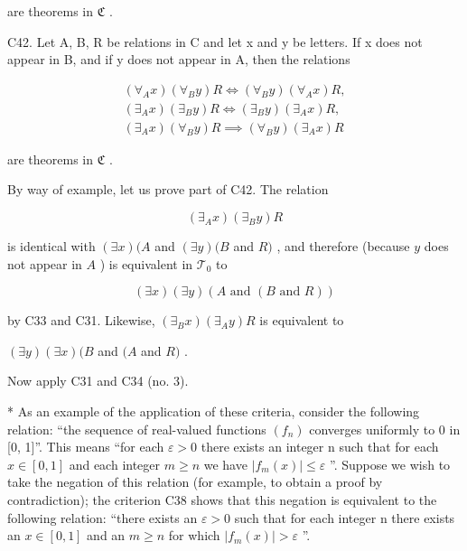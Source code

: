 are theorems in \(\mathfrak{C}\) .

C42. Let A, B, R be relations in C and let x and y be letters. If x does not appear in B, and if y does not appear in A, then the relations

\[
\begin{array}{l} (\forall_ {A} x) (\forall_ {B} y) R \iff (\forall_ {B} y) (\forall_ {A} x) R, \\ (\exists_ {A} x) (\exists_ {B} y) R \iff (\exists_ {B} y) (\exists_ {A} x) R, \\ (\exists_ {A} x) (\forall_ {B} y) R \implies (\forall_ {B} y) (\exists_ {A} x) R \end{array}
\]

are theorems in \(\mathfrak{C}\) .

By way of example, let us prove part of C42. The relation

\[
(\exists_ {A} x) (\exists_ {B} y) R
\]

is identical with \((\exists x)(A\) and \((\exists y)(B\) and \(R)\) , and therefore (because \(y\) does not appear in \(A\) ) is equivalent in \(\mathcal{T}_0\) to

\[
(\exists x) (\exists y) (A \text {   and   } (B \text {   and   } R))
\]

by C33 and C31. Likewise, \((\exists_{B}x)(\exists_{A}y)R\) is equivalent to

\((\exists y)(\exists x)(B\) and \((A\) and \(R)\) .

Now apply C31 and C34 (no. 3).

* As an example of the application of these criteria, consider the following relation: ``the sequence of real-valued functions \((f_{n})\) converges uniformly to 0 in {[}0, 1{]}''. This means ``for each \(\varepsilon > 0\) there exists an integer n such that for each \(x \in [0, 1]\) and each integer \(m \geqslant n\) we have \(|f_{m}(x)| \leqslant \varepsilon\) ''. Suppose we wish to take the negation of this relation (for example, to obtain a proof by contradiction); the criterion C38 shows that this negation is equivalent to the following relation: ``there exists an \(\varepsilon > 0\) such that for each integer n there exists an \(x \in [0, 1]\) and an \(m \geqslant n\) for which \(|f_{m}(x)| > \varepsilon\) ''.

